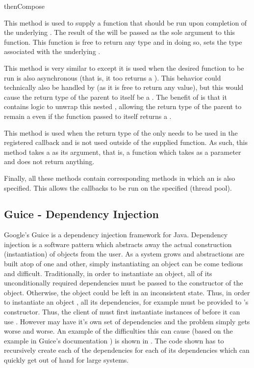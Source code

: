 \begin{labeling}{thenCompose}
	\item [thenApply] This method is used to supply a function that should be run upon completion of the underlying . The result of the  will be passed as the sole argument to this function. This function is free to return any type and in doing so, sets the type associated with the underlying . 
	\item [thenCompose] This method is very similar to  except it is used when the desired function to be run is also asynchronous (that is, it too returns a ). This behavior could technically also be handled by  (as it is free to return any value), but this would cause the return type of the parent  to itself be a . The benefit of  is that it contains logic to unwrap this nested , allowing the return type of the parent to remain a  even if the function passed to  itself returns a .
	\item [thenAccept] This method is used when the return type of the  only needs to be used in the registered callback and is not used outside of the supplied function. As such, this method takes a  as its argument, that is, a function which takes  as a parameter and does not return anything.  
\end{labeling}

Finally, all these methods contain corresponding methods in which an  is also specified. This allows the callbacks to be run on the specified  (thread pool).


\subsection{Guice - Dependency Injection}\label{sec:guice}
Google's Guice \cite{guice} is a dependency injection framework for Java. Dependency injection is a software pattern which abstracts away the actual construction (instantiation) of objects from the user. As a system grows and abstractions are built atop of one and other, simply instantiating an object can be come tedious and difficult. Traditionally, in order to instantiate an object, all of its unconditionally required dependencies must be passed to the constructor of the object. Otherwise, the object could be left in an inconsistent state. Thus, in order to instantiate an object , all its dependencies, for example  must be provided to 's constructor. Thus, the client of  must first instantiate instances of  before it can use . However  may have it's own set of dependencies and the problem simply gets worse and worse. An example of the difficulties this can cause (based on the example in Guice's documentation \cite{guiceDocs}) is shown in . The code shown has to recursively create each of the dependencies for each of its dependencies which can quickly get out of hand for large systems.

